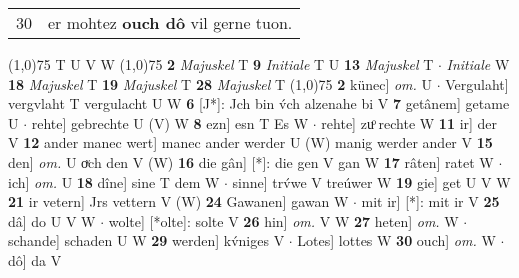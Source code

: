 \documentclass[8pt,a4paper,notitlepage]{article}
\begin{document}
\begin{table}[ht]
\begin{minipage}[t]{0.5\linewidth}
\begin{tabular}{rl}
30 & er mohtez \textbf{ouch dô} vil gerne tuon.\\ 
\end{tabular}
\scriptsize
\line(1,0){75} \newline
T U V W \newline
\line(1,0){75} \newline
\textbf{2} \textit{Majuskel} T  \textbf{9} \textit{Initiale} T U  \textbf{13} \textit{Majuskel} T   $\cdot$ \textit{Initiale} W  \textbf{18} \textit{Majuskel} T  \textbf{19} \textit{Majuskel} T  \textbf{28} \textit{Majuskel} T  \newline
\line(1,0){75} \newline
\textbf{2} künec] \textit{om.} U  $\cdot$ Vergulaht] vergvlaht T vergulacht U W \textbf{6} [J*]: Jch bin v́ch alzenahe bi V \textbf{7} getânem] getame U  $\cdot$ rehte] gebrechte U (V) W \textbf{8} ezn] esn T Es W  $\cdot$ rehte] zuͦ rechte W \textbf{11} ir] der V \textbf{12} ander manec wert] manec ander werder U (W) manig werder ander V \textbf{15} den] \textit{om.} U oͮch den V (W) \textbf{16} die gân] [*]: die gen V gan W \textbf{17} râten] ratet W  $\cdot$ ich] \textit{om.} U \textbf{18} dîne] sine T dem W  $\cdot$ sinne] trv́we V treúwer W \textbf{19} gie] get U V W \textbf{21} ir vetern] Jrs vettern V (W) \textbf{24} Gawanen] gawan W  $\cdot$ mit ir] [*]: mit ir V \textbf{25} dâ] do U V W  $\cdot$ wolte] [*olte]: solte V \textbf{26} hin] \textit{om.} V W \textbf{27} heten] \textit{om.} W  $\cdot$ schande] schaden U W \textbf{29} werden] kv́niges V  $\cdot$ Lotes] lottes W \textbf{30} ouch] \textit{om.} W  $\cdot$ dô] da V \newline
\end{minipage}
\end{table}
\end{document}
